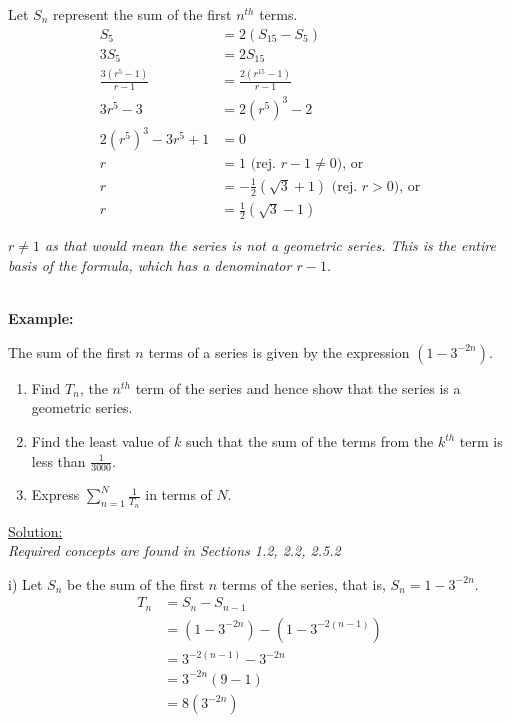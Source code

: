 \documentclass[12pt, a4paper, titlepage]{article}
\begin{document}
Let $S_n$ represent the sum of the first $n^{th}$ terms.
\begin{align*}
    S_5 &= 2(S_{15} - S_5) \\
    3S_5 &= 2S_{15} \\
    \frac{3(r^5 - 1)}{r - 1} &= \frac{2(r^{15} - 1)}{r - 1} \\
    3r^5 - 3 &= 2(r^5)^3 - 2 \\
    2(r^5)^3 - 3r^5 + 1 &= 0 \\
    r &= 1 \text{ (rej. } r - 1 \neq 0 \text{), or} \\
    r &= -\frac{1}{2}(\sqrt{3} + 1) \text{ (rej. } r > 0 \text{), or} \\
    r &= \frac{1}{2}(\sqrt{3} - 1)
\end{align*}

\emph{$r \neq 1$ as that would mean the series is not a geometric series. This is the entire basis of the formula, which has a denominator $r - 1$}.

\textbf{\\ Example:}

The sum of the first $n$ terms of a series is given by the expression $(1 - 3^{-2n})$.

\begin{enumerate}[label=(\roman*)]
    \item Find $T_n$, the $n^{th}$ term of the series and hence show that the series is a geometric series.
    \item Find the least value of $k$ such that the sum of the terms from the $k^{th}$ term is less than $\frac{1}{3000}$.
    \item Express $\sum^N_{n = 1} \frac{1}{T_n}$ in terms of $N$.
\end{enumerate}

\begin{flushright}
\end{flushright}

\underline{Solution:} \\
\emph{Required concepts are found in Sections 1.2, 2.2, 2.5.2}

i)
Let $S_n$ be the sum of the first $n$ terms of the series, that is, $S_n = 1 - 3^{-2n}$.
\begin{align*}
    T_n &= S_n - S_{n - 1} \\
    &= (1 - 3^{-2n}) - (1 - 3^{-2(n - 1)}) \\
    &= 3^{-2(n - 1)} - 3^{-2n} \\
    &= 3^{-2n}(9 - 1) \\
    &= 8(3^{-2n})
\end{align*}
\end{document}
